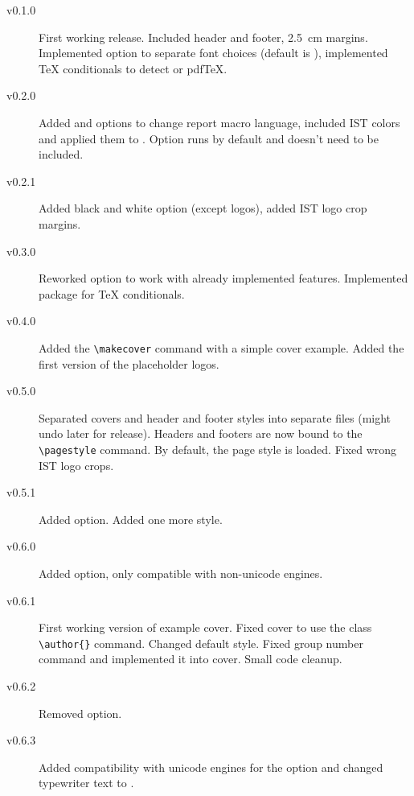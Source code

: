 \documentclass[palatino,english]{ist-report}
\begin{document}
\begin{description}
	\item [v0.1.0] First working release. Included header and footer, \SI{2.5}{\centi\meter} margins. Implemented  option to separate font choices (default is ), implemented \TeX{} conditionals to detect \XeTeX{} or pdf\TeX{}.
	\item [v0.2.0] Added  and  options to change report macro language, included IST colors and applied them to . Option  runs by default and doesn't need to be included.
	\item [v0.2.1] Added black and white option (except logos), added IST logo crop margins.
	\item [v0.3.0] Reworked  option to work with already implemented features. Implemented  package for \TeX{} conditionals.
	\item [v0.4.0] Added the \verb|\makecover| command with a simple cover example. Added the first version of the placeholder logos.
	\item [v0.5.0] Separated covers and header and footer styles into separate files (might undo later for release). Headers and footers are now bound to the \verb|\pagestyle| command. By default, the  page style is loaded. Fixed wrong IST logo crops.
	\item [v0.5.1] Added  option. Added one more style.
	\item [v0.6.0] Added  option, only compatible with non-unicode engines.
	\item [v0.6.1] First working version of example cover. Fixed cover to use the  class \verb|\author{}| command. Changed default style. Fixed group number command and implemented it into cover. Small code cleanup.
	\item [v0.6.2] Removed  option.
	\item [v0.6.3] Added compatibility with unicode engines for the  option and changed typewriter text to .
\end{description}

\printbibliography
\end{document}
